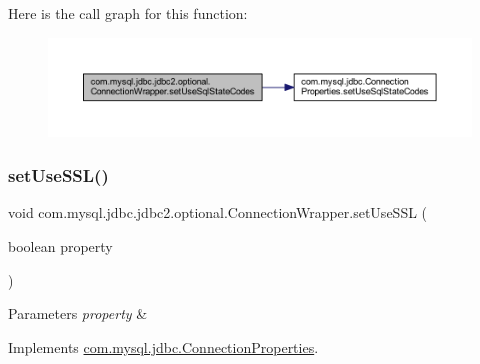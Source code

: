 Here is the call graph for this function\+:
\nopagebreak
\begin{figure}[H]
\begin{center}
\leavevmode
\includegraphics[width=350pt]{classcom_1_1mysql_1_1jdbc_1_1jdbc2_1_1optional_1_1_connection_wrapper_a5a221de19389e4c32fffb7532d8816ff_cgraph}
\end{center}
\end{figure}
\mbox{\label{classcom_1_1mysql_1_1jdbc_1_1jdbc2_1_1optional_1_1_connection_wrapper_afe754fe2674d4bbab1ba44cb09a81db6}} 
\subsubsection{\texorpdfstring{set\+Use\+S\+S\+L()}{setUseSSL()}}
{\footnotesize\ttfamily void com.\+mysql.\+jdbc.\+jdbc2.\+optional.\+Connection\+Wrapper.\+set\+Use\+S\+SL (\begin{DoxyParamCaption}\item[{boolean}]{property }\end{DoxyParamCaption})}


\begin{DoxyParams}{Parameters}
{\em property} & \\
\hline
\end{DoxyParams}


Implements \mbox{\hyperlink{interfacecom_1_1mysql_1_1jdbc_1_1_connection_properties_a34adc2d834bd1ce90f8c8e65498906bd}{com.\+mysql.\+jdbc.\+Connection\+Properties}}.

